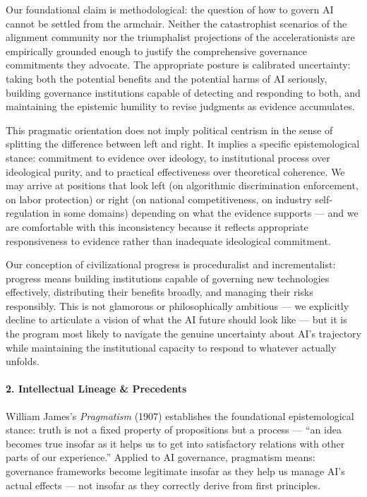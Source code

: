 Our foundational claim is methodological: the question of how to govern
AI cannot be settled from the armchair. Neither the catastrophist
scenarios of the alignment community nor the triumphalist projections of
the accelerationists are empirically grounded enough to justify the
comprehensive governance commitments they advocate. The appropriate
posture is calibrated uncertainty: taking both the potential benefits
and the potential harms of AI seriously, building governance
institutions capable of detecting and responding to both, and
maintaining the epistemic humility to revise judgments as evidence
accumulates.

This pragmatic orientation does not imply political centrism in the
sense of splitting the difference between left and right. It implies a
specific epistemological stance: commitment to evidence over ideology,
to institutional process over ideological purity, and to practical
effectiveness over theoretical coherence. We may arrive at positions
that look left (on algorithmic discrimination enforcement, on labor
protection) or right (on national competitiveness, on industry
self-regulation in some domains) depending on what the evidence supports
--- and we are comfortable with this inconsistency because it reflects
appropriate responsiveness to evidence rather than inadequate
ideological commitment.

Our conception of civilizational progress is proceduralist and
incrementalist: progress means building institutions capable of
governing new technologies effectively, distributing their benefits
broadly, and managing their risks responsibly. This is not glamorous or
philosophically ambitious --- we explicitly decline to articulate a
vision of what the AI future should look like --- but it is the program
most likely to navigate the genuine uncertainty about AI's trajectory
while maintaining the institutional capacity to respond to whatever
actually unfolds.

\paragraph{2. Intellectual Lineage \&
Precedents}\label{intellectual-lineage-precedents-29}

William James's \emph{Pragmatism} (1907) establishes the foundational
epistemological stance: truth is not a fixed property of propositions
but a process --- ``an idea becomes true insofar as it helps us to get
into satisfactory relations with other parts of our experience.''
Applied to AI governance, pragmatism means: governance frameworks become
legitimate insofar as they help us manage AI's actual effects --- not
insofar as they correctly derive from first principles.


